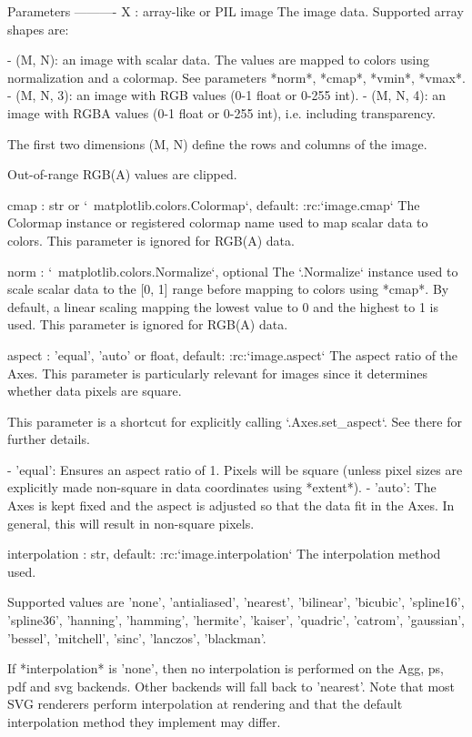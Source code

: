 \begin{DoxyVerb}
\begin{DoxyVerb}
Parameters
----------
X : array-like or PIL image
    The image data. Supported array shapes are:

    - (M, N): an image with scalar data. The values are mapped to
      colors using normalization and a colormap. See parameters *norm*,
      *cmap*, *vmin*, *vmax*.
    - (M, N, 3): an image with RGB values (0-1 float or 0-255 int).
    - (M, N, 4): an image with RGBA values (0-1 float or 0-255 int),
      i.e. including transparency.

    The first two dimensions (M, N) define the rows and columns of
    the image.

    Out-of-range RGB(A) values are clipped.

cmap : str or `~matplotlib.colors.Colormap`, default: :rc:`image.cmap`
    The Colormap instance or registered colormap name used to map
    scalar data to colors. This parameter is ignored for RGB(A) data.

norm : `~matplotlib.colors.Normalize`, optional
    The `.Normalize` instance used to scale scalar data to the [0, 1]
    range before mapping to colors using *cmap*. By default, a linear
    scaling mapping the lowest value to 0 and the highest to 1 is used.
    This parameter is ignored for RGB(A) data.

aspect : {'equal', 'auto'} or float, default: :rc:`image.aspect`
    The aspect ratio of the Axes.  This parameter is particularly
    relevant for images since it determines whether data pixels are
    square.

    This parameter is a shortcut for explicitly calling
    `.Axes.set_aspect`. See there for further details.

    - 'equal': Ensures an aspect ratio of 1. Pixels will be square
      (unless pixel sizes are explicitly made non-square in data
      coordinates using *extent*).
    - 'auto': The Axes is kept fixed and the aspect is adjusted so
      that the data fit in the Axes. In general, this will result in
      non-square pixels.

interpolation : str, default: :rc:`image.interpolation`
    The interpolation method used.

    Supported values are 'none', 'antialiased', 'nearest', 'bilinear',
    'bicubic', 'spline16', 'spline36', 'hanning', 'hamming', 'hermite',
    'kaiser', 'quadric', 'catrom', 'gaussian', 'bessel', 'mitchell',
    'sinc', 'lanczos', 'blackman'.

    If *interpolation* is 'none', then no interpolation is performed
    on the Agg, ps, pdf and svg backends. Other backends will fall back
    to 'nearest'. Note that most SVG renderers perform interpolation at
    rendering and that the default interpolation method they implement
    may differ.


\end{DoxyVerb}
\end{DoxyVerb}
